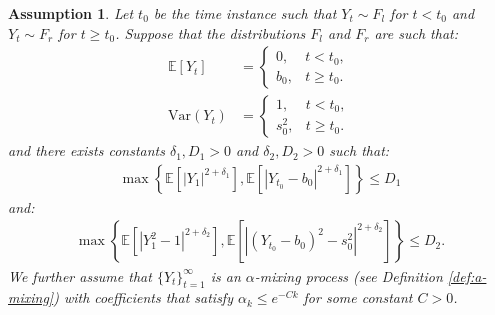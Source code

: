 \documentclass{article}
\newcommand{\E}{\mathbb{E}}
\newcommand{\Var}{\text{Var}}
\newtheorem{assumption}{Assumption}
\begin{document}
\begin{assumption}
Let $t_0$ be the time instance such that $Y_t \sim F_l$ for $t < t_0$ and $Y_t \sim F_r$ for $t \geq t_0$. Suppose that the distributions $F_l$ and $F_r$ are such that:
\begin{align*}
    \E[Y_t] &= 
    \begin{cases}
        0, & t < t_0, \\
        b_0, & t \geq t_0.
    \end{cases} \\
    \Var(Y_t) &= 
    \begin{cases}
        1, & t < t_0, \\
        s_0^2, & t \geq t_0.
    \end{cases}
\end{align*}
and there exists constants $\delta_1, D_1 > 0$ and $\delta_2, D_2 > 0$ such that:
\begin{align*}
    \max\left\{\E\left[|Y_1|^{2+\delta_1}\right], \E\left[|Y_{t_0} - b_0|^{2+\delta_1}\right]\right\} \leq D_1
\end{align*}
and:
\begin{align*}
    \max\left\{\E\left[|Y^2_1 - 1|^{2+\delta_2}\right], \E\left[|(Y_{t_0} - b_0)^2 - s_0^2|^{2+\delta_2}\right]\right\} \leq D_2.
\end{align*}
We further assume that $\{Y_t\}_{t=1}^\infty$ is an $\alpha$-mixing process (see Definition \ref{def:a-mixing}) with coefficients that satisfy $\alpha_k \leq e^{-Ck}$ for some constant $C > 0$.
\end{assumption}

\end{document}
